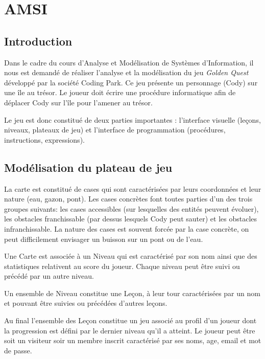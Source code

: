 \documentclass[]{article}
\date{}
\begin{document}
\hypertarget{amsi}{%
\section{AMSI}\label{amsi}}

\hypertarget{introduction}{%
\subsection{Introduction}\label{introduction}}

Dans le cadre du cours d'Analyse et Modélisation de Systèmes
d'Information, il nous est demandé de réaliser l'analyse et la
modélisation du jeu \emph{Golden Quest} développé par la société Coding
Park. Ce jeu présente un personnage (Cody) sur une île au trésor. Le
joueur doit écrire une procédure informatique afin de déplacer Cody sur
l'île pour l'amener au trésor.

Le jeu est donc constitué de deux parties importantes : l'interface
visuelle (leçons, niveaux, plateaux de jeu) et l'interface de
programmation (procédures, instructions, expressions).

\hypertarget{moduxe9lisation-du-plateau-de-jeu}{%
\subsection{Modélisation du plateau de
jeu}\label{moduxe9lisation-du-plateau-de-jeu}}

La carte est constitué de cases qui sont caractérisées par leurs
coordonnées et leur nature (eau, gazon, pont). Les cases concrètes font
toutes parties d'un des trois groupes suivants: les cases accessibles
(sur lesquelles des entités peuvent évoluer), les obstacles
franchissable (par dessus lesquels Cody peut sauter) et les obstacles
infranchissable. La nature des cases est souvent forcée par la case
concrète, on peut difficilement envisager un buisson sur un pont ou de
l'eau.

Une Carte est associée à un Niveau qui est caractérisé par son nom ainsi
que des statistiques relativent au score du joueur. Chaque niveau peut
être suivi ou précédé par un autre niveau.

Un ensemble de Niveau constitue une Leçon, à leur tour caractérisées par
un nom et pouvant être suivies ou précédées d'autres leçons.

Au final l'ensemble des Leçon constitue un jeu associé au profil d'un
joueur dont la progression est défini par le dernier niveau qu'il a
atteint. Le joueur peut être soit un visiteur soir un membre inscrit
caractérisé par ses noms, age, email et mot de passe.
\end{document}
